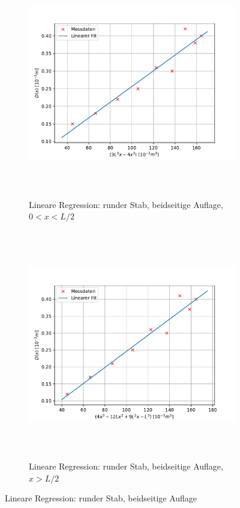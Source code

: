 \begin{figure}[H]
  \begin{subfigure}{\textwidth}
  \centering
  \includegraphics[height=10cm]{content/plots/rundb1.pdf}
  \caption{Lineare Regression: runder Stab, beidseitige Auflage, $0<x<L/2$}
  \label{fig:LinRegrundb1}
  \end{subfigure}
  \hfill
  \begin{subfigure}{\textwidth}
  \centering
  \includegraphics[height=10cm]{content/plots/rundb2.pdf}
  \caption{Lineare Regression: runder Stab, beidseitige Auflage, $x>L/2$}
  \label{fig:LinRegrundb2}
  \end{subfigure}
  \caption{Lineare Regression: runder Stab, beidseitige Auflage}
  \label{fig:LinRegrundb}
\end{figure}

